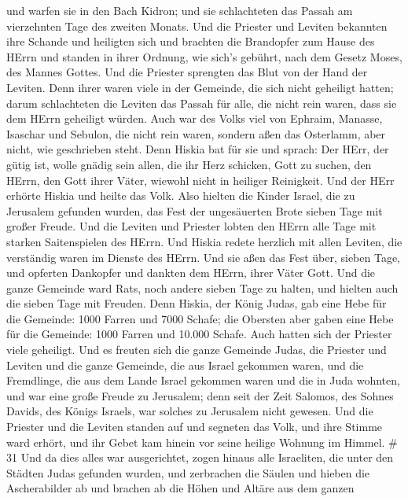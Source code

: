 und warfen sie in den Bach Kidron;  und sie schlachteten
das Passah am vierzehnten Tage des zweiten Monats. Und die Priester und
Leviten bekannten ihre Schande und heiligten sich und brachten die
Brandopfer zum Hause des HErrn  und standen in ihrer
Ordnung, wie sich's gebührt, nach dem Gesetz Moses, des Mannes Gottes.
Und die Priester sprengten das Blut von der Hand der Leviten.
 Denn ihrer waren viele in der Gemeinde, die sich nicht
geheiligt hatten; darum schlachteten die Leviten das Passah für alle,
die nicht rein waren, dass sie dem HErrn geheiligt würden. 
Auch war des Volks viel von Ephraim, Manasse, Isaschar und Sebulon, die
nicht rein waren, sondern aßen das Osterlamm, aber nicht, wie
geschrieben steht. Denn Hiskia bat für sie und sprach: Der HErr, der
gütig ist, wolle gnädig sein  allen, die ihr Herz schicken,
Gott zu suchen, den HErrn, den Gott ihrer Väter, wiewohl nicht in
heiliger Reinigkeit.  Und der HErr erhörte Hiskia und
heilte das Volk.  Also hielten die Kinder Israel, die zu
Jerusalem gefunden wurden, das Fest der ungesäuerten Brote sieben Tage
mit großer Freude. Und die Leviten und Priester lobten den HErrn alle
Tage mit starken Saitenspielen des HErrn.  Und Hiskia
redete herzlich mit allen Leviten, die verständig waren im Dienste des
HErrn. Und sie aßen das Fest über, sieben Tage, und opferten Dankopfer
und dankten dem HErrn, ihrer Väter Gott.  Und die ganze
Gemeinde ward Rats, noch andere sieben Tage zu halten, und hielten auch
die sieben Tage mit Freuden.  Denn Hiskia, der König Judas,
gab eine Hebe für die Gemeinde: 1000 Farren und 7000 Schafe; die
Obersten aber gaben eine Hebe für die Gemeinde: 1000 Farren und 10.000
Schafe. Auch hatten sich der Priester viele geheiligt.  Und
es freuten sich die ganze Gemeinde Judas, die Priester und Leviten und
die ganze Gemeinde, die aus Israel gekommen waren, und die Fremdlinge,
die aus dem Lande Israel gekommen waren und die in Juda wohnten,
 und war eine große Freude zu Jerusalem; denn seit der Zeit
Salomos, des Sohnes Davids, des Königs Israels, war solches zu Jerusalem
nicht gewesen.  Und die Priester und die Leviten standen
auf und segneten das Volk, und ihre Stimme ward erhört, und ihr Gebet
kam hinein vor seine heilige Wohnung im Himmel. \# 31  Und
da dies alles war ausgerichtet, zogen hinaus alle Israeliten, die unter
den Städten Judas gefunden wurden, und zerbrachen die Säulen und hieben
die Ascherabilder ab und brachen ab die Höhen und Altäre aus dem ganzen
